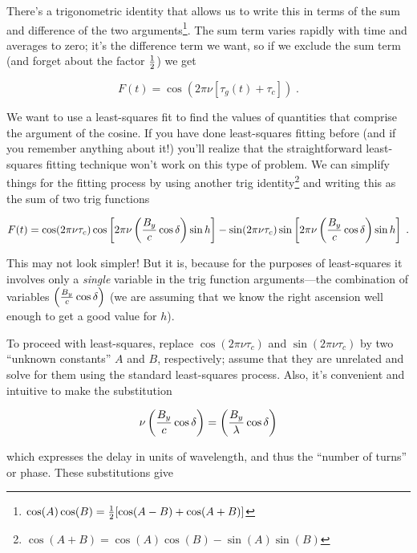 \documentclass[11pt,preprint]{aastex}
\begin{document}
\noindent There's a trigonometric identity that allows us to write this
in terms of the sum and difference of the two
arguments\footnote{$\cos(A) \cos(B)= {1 \over 2}[\cos(A-B) +
\cos(A+B)]$}. The sum term varies rapidly with time and averages to zero;
it's the difference term we want, so if we exclude the sum term (and
forget about the factor $1 \over 2$) we get

\begin{equation}
 F(t) = \cos (2 \pi \nu [\tau_{g}(t) + \tau_c]) \; . 
\end{equation}


	We want to use a least-squares fit to find the values of
quantities that comprise the argument of the cosine.  If you have done
least-squares fitting before (and if you remember anything about it!)
you'll realize that the straightforward least-squares fitting technique
won't work on this type of problem.  We can simplify things for the
fitting process by using another trig identity\footnote{$\cos(A+B) =
\cos(A)\cos(B) - \sin(A)\sin(B)$} and writing this as the
sum of two trig functions

\begin{equation}
 F(t) = \cos(2 \pi \nu \tau_c) \cos \left[2 \pi \nu \left({B_y \over c}
	\cos\delta \right) \sin h\right] - \sin(2 \pi \nu \tau_c) 
	\sin \left[ 2 \pi \nu \left({B_y \over c}\cos\delta \right) \sin h\right] \; .  
\end{equation}


\noindent This may not look simpler! But it is, because for the purposes
of least-squares it involves only a {\it single} variable in the trig
function arguments---the combination of variables $\left({B_y \over c}
\cos\delta \right)$ (we are assuming that we know the right ascension
well enough to get a good value for $h$). 

	To proceed with least-squares, replace $\cos (2 \pi \nu \tau_c)$
and $\sin (2 \pi \nu \tau_c)$ by two ``unknown constants'' $A$ and $B$,
respectively; assume that they are unrelated and solve for them using
the standard least-squares process. Also, it's convenient and intuitive
to make the substitution 

\begin{equation}
\nu \left( {B_y \over c} \cos \delta \right) = \left( {B_y \over \lambda}
\cos \delta \right)
\end{equation}

\noindent which expresses the delay in units of wavelength, and thus the
``number of turns'' or phase. These substitutions give
\end{document}
